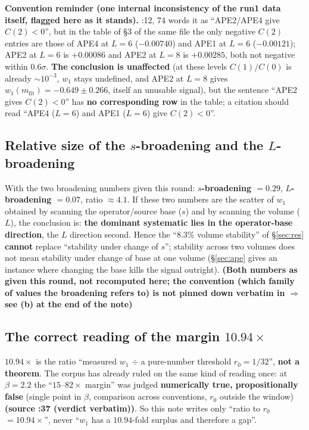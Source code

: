 \documentclass[11pt,a4paper]{article}
\newcommand{\code}[1]{\texttt{\footnotesize\detokenize{#1}}}
\newcommand{\gr}[1]{\textbf{(#1)}}
\begin{document}
\textbf{Convention reminder (one internal inconsistency of the run1 data itself, flagged here as it stands).}
\code{RUN1.md}:12, 74 words it as ``APE2/APE4 give $C(2)<0$'', but in the table of \S3 of the same file the only negative $C(2)$ entries are those of
APE4 at $L=6$ ($-0.00740$) and APE1 at $L=6$ ($-0.00121$);
APE2 at $L=6$ is $+0.00086$ and APE2 at $L=8$ is $+0.00285$, both not negative within $0.6\sigma$.
\textbf{The conclusion is unaffected} (at these levels $C(1)/C(0)$ is already $\sim10^{-3}$, $w_1$ stays undefined,
and APE2 at $L=8$ gives $w_1(m_{\text{fit}})=-0.649\pm0.266$, itself an unusable signal),
but the sentence ``APE2 gives $C(2)<0$'' has \textbf{no corresponding row} in the table; a citation should read
``APE4 ($L=6$) and APE1 ($L=6$) give $C(2)<0$''.

\subsection{Relative size of the $s$-broadening and the $L$-broadening}

With the two broadening numbers given this round: \textbf{$s$-broadening $=0.29$}, \textbf{$L$-broadening $=0.07$}, ratio $\approx4.1$.
If these two numbers are the scatter of $w_1$ obtained by scanning the operator/source base ($s$) and by scanning the volume ($L$), the conclusion is:
\textbf{the dominant systematic lies in the operator-base direction}, the $L$ direction second.
Hence the ``$8.3\%$ volume stability'' of \S\ref{sec:res} \textbf{cannot} replace ``stability under change of $s$'';
stability across two volumes does not mean stability under change of base at one volume (\S\ref{sec:ape} gives an instance where changing the base
kills the signal outright).
\gr{Both numbers as given this round, not recomputed here; the convention (which family of values the broadening refers to) is not pinned down
verbatim in \code{RUN1} $\Rightarrow$ see (b) at the end of the note}

\subsection{The correct reading of the margin $10.94\times$}

$10.94\times$ is the ratio ``measured $w_1$ $\div$ a pure-number threshold $r_0=1/32$'', \textbf{not a theorem}.
The corpus has already ruled on the same kind of reading once: at $\beta=2.2$ the ``$15$--$82\times$ margin'' was judged
\textbf{numerically true, propositionally false}
(single point in $\beta$, comparison across conventions, $r_0$ outside the window)
\gr{source \code{U15.md}:37 (verdict verbatim)}.
So this note writes only ``ratio to $r_0$ $=10.94\times$'', never ``$w_1$ has a $10.94$-fold surplus and therefore a gap''.
\end{document}
